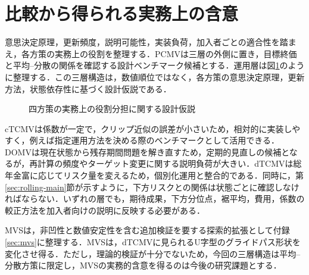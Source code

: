 \documentclass[10pt,a4paper]{article}
\theoremstyle{plain}
\theoremstyle{definition}
\begin{document}
\section{比較から得られる実務上の含意}\label{sec:implementation}
意思決定原理，更新頻度，説明可能性，実装負荷，加入者ごとの適合性を踏まえ，各方策の実務上の役割を整理する．PCMVは三層の外側に置き，目標終価と平均--分散の関係を確認する設計ベンチマーク候補とする．運用層は図\ref{fig:three-layer}のように整理する．この三層構造は，数値順位ではなく，各方策の意思決定原理，更新方法，状態依存性に基づく設計仮説である．

\begin{figure}[htbp]
\centering
{}
\caption{四方策の実務上の役割分担に関する設計仮説}
\label{fig:three-layer}
\end{figure}

cTCMVは係数が一定で，クリップ近似の誤差が小さいため，相対的に実装しやすく，例えば指定運用方法を決める際のベンチマークとして活用できる．DOMVは現在状態から残存期間問題を解き直すため，定期的見直しの候補となるが，再計算の頻度やターゲット変更に関する説明負荷が大きい．dTCMVは総年金富に応じてリスク量を変えるため，個別化運用と整合的である．同時に，第\ref{sec:rolling-main}節が示すように，下方リスクとの関係は状態ごとに確認しなければならない．いずれの層でも，期待成果，下方分位点，裾平均，費用，係数の較正方法を加入者向けの説明に反映する必要がある．

MVSは，非凹性と数値安定性を含む追加検証を要する探索的拡張として付録\ref{sec:mvs}に整理する．MVSは，dTCMVに見られるU字型のグライドパス形状を変化させ得る．ただし，理論的検証が十分でないため，今回の三層構造は平均--分散方策に限定し，MVSの実務的含意を得るのは今後の研究課題とする．
\end{document}
